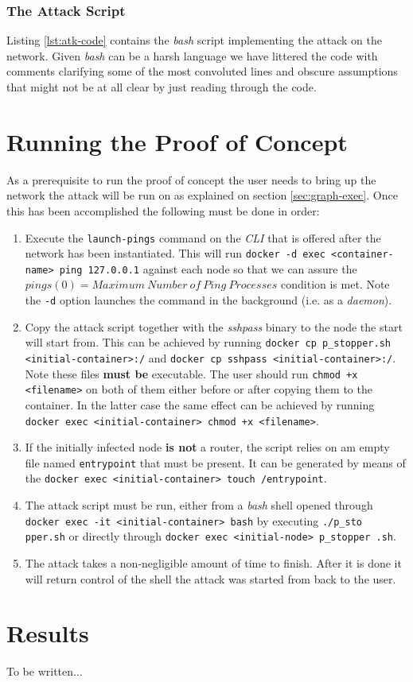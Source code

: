         \subsubsection{The Attack Script}
            Listing \ref{lst:atk-code} contains the \textit{bash} script implementing the attack on the network. Given \textit{bash} can be a harsh language we have littered the code with comments clarifying some of the most convoluted lines and obscure assumptions that might not be at all clear by just reading through the code.

            

    \section{Running the Proof of Concept}
        As a prerequisite to run the proof of concept the user needs to bring up the network the attack will be run on as explained on section \ref{sec:graph-exec}. Once this has been accomplished the following must be done in order:

        \begin{enumerate}
            \item Execute the \texttt{launch-pings} command on the \textit{CLI} that is offered after the network has been instantiated. This will run \texttt{docker -d exec <container-name> ping 127.0.0.1} against each node so that we can assure the $pings(0) = Maximum\ Number\ of\ Ping\ Processes$ condition is met. Note the \texttt{-d} option launches the command in the background (i.e. as a \textit{daemon}).
            \item Copy the attack script together with the \textit{sshpass} binary to the node the start will start from. This can be achieved by running \texttt{docker cp p\_stopper.sh <initial-container>:/} and \texttt{docker cp sshpass <initial-container>:/}. Note these files \textbf{must be} executable. The user should run \texttt{chmod +x <filename>} on both of them either before or after copying them to the container. In the latter case the same effect can be achieved by running \texttt{docker exec <initial-container> chmod +x <filename>}.
            \item If the initially infected node \textbf{is not} a router, the script relies on am empty file named \texttt{entrypoint} that must be present. It can be generated by means of the \texttt{docker exec <initial-container> touch /entrypoint}.
            \item The attack script must be run, either from a \textit{bash} shell opened through \texttt{docker exec -it <initial-container> bash} by executing \texttt{./p\_sto pper.sh} or directly through \texttt{docker exec <initial-node> p\_stopper .sh}.
            \item The attack takes a non-negligible amount of time to finish. After it is done it will return control of the shell the attack was started from back to the user.
        \end{enumerate}

    \section{Results}
        To be written...
